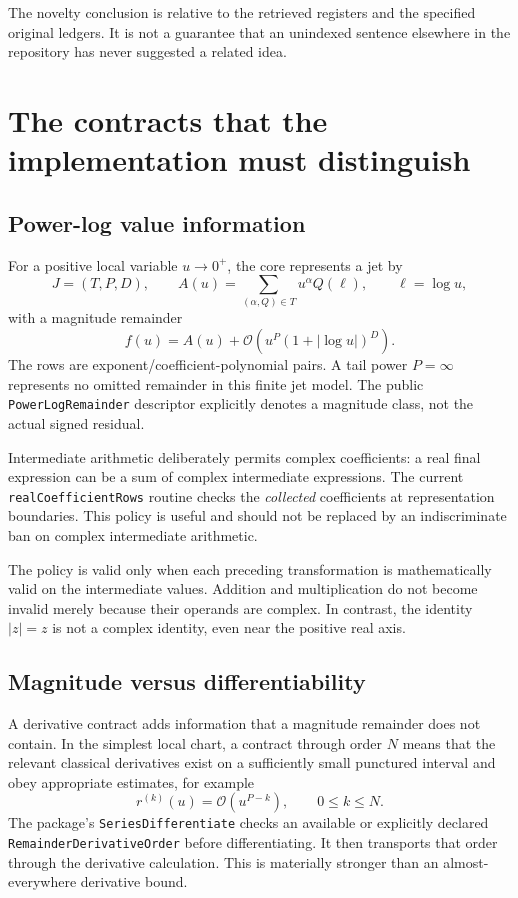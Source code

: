 \documentclass[11pt,a4paper]{article}
\newcommand{\code}[1]{\nolinkurl{#1}}
\newcommand{\OO}{\mathcal O}
\begin{document}
The novelty conclusion is relative to the retrieved registers and the specified original ledgers. It is not a guarantee that an unindexed sentence elsewhere in the repository has never suggested a related idea.

\section{The contracts that the implementation must distinguish}
\subsection{Power-log value information}

For a positive local variable $u\to0^+$, the core represents a jet by
\[
 J=(T,P,D),\qquad
 A(u)=\sum_{(\alpha,Q)\in T}u^\alpha Q(\ell),\qquad \ell=\log u,
\]
with a magnitude remainder
\[
 f(u)=A(u)+\OO\!\left(u^P(1+|\log u|)^D\right).
\]
The rows are exponent/coefficient-polynomial pairs. A tail power $P=\infty$ represents no omitted remainder in this finite jet model. The public \code{PowerLogRemainder} descriptor explicitly denotes a magnitude class, not the actual signed residual.\cite{core}

Intermediate arithmetic deliberately permits complex coefficients: a real final expression can be a sum of complex intermediate expressions. The current \code{realCoefficientRows} routine checks the \emph{collected} coefficients at representation boundaries. This policy is useful and should not be replaced by an indiscriminate ban on complex intermediate arithmetic.\cite{core}

The policy is valid only when each preceding transformation is mathematically valid on the intermediate values. Addition and multiplication do not become invalid merely because their operands are complex. In contrast, the identity $|z|=z$ is not a complex identity, even near the positive real axis.

\subsection{Magnitude versus differentiability}

A derivative contract adds information that a magnitude remainder does not contain. In the simplest local chart, a contract through order $N$ means that the relevant classical derivatives exist on a sufficiently small punctured interval and obey appropriate estimates, for example
\[
 r^{(k)}(u)=\OO(u^{P-k}),\qquad 0\leq k\leq N.
\]
The package's \code{SeriesDifferentiate} checks an available or explicitly declared \code{RemainderDerivativeOrder} before differentiating. It then transports that order through the derivative calculation. This is materially stronger than an almost-everywhere derivative bound.\cite{operations}
\end{document}

